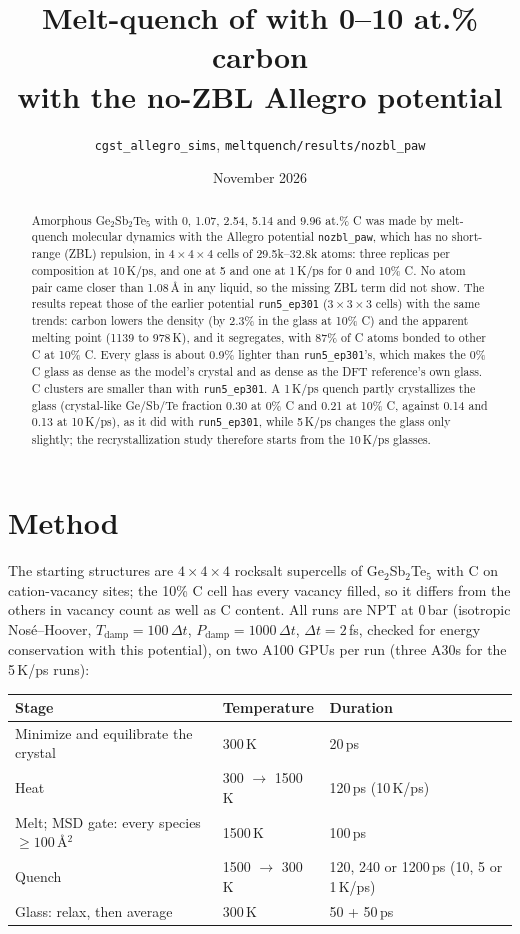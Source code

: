 \documentclass[11pt]{article}
\title{Melt-quench of \GST{} with 0--10 at.\% carbon\\ with the no-ZBL Allegro potential \nozbl}
\author{\texttt{cgst\_allegro\_sims}, \texttt{meltquench/results/nozbl\_paw}}
\date{November 2026}
\newcommand{\GST}{Ge$_2$Sb$_2$Te$_5$}
\newcommand{\nozbl}{\texttt{nozbl\_paw}}
\newcommand{\runfive}{\texttt{run5\_ep301}}
\begin{document}
\maketitle

\begin{abstract}
Amorphous \GST{} with 0, 1.07, 2.54, 5.14 and 9.96 at.\% C was made by melt-quench molecular dynamics with the
Allegro potential \nozbl{}, which has no short-range (ZBL) repulsion, in $4\times4\times4$ cells of 29.5k--32.8k
atoms: three replicas per composition at 10\,K/ps, and one at 5 and one at 1\,K/ps for 0 and 10\% C. No atom pair
came closer than 1.08\,\AA{} in any liquid, so the missing ZBL term did not show. The results repeat those of the
earlier potential \runfive{} ($3\times3\times3$ cells) with the same trends: carbon lowers the density (by 2.3\% in
the glass at 10\% C) and the apparent melting point (1139 to 978\,K), and it segregates, with 87\% of C atoms bonded
to other C at 10\% C. Every glass is about 0.9\% lighter than \runfive{}'s, which makes the 0\% C glass as dense as
the model's crystal and as dense as the DFT reference's own glass. C clusters are smaller than with \runfive{}.
A 1\,K/ps quench partly crystallizes the glass (crystal-like Ge/Sb/Te fraction 0.30 at 0\% C and 0.21 at 10\% C,
against 0.14 and 0.13 at 10\,K/ps), as it did with \runfive{}, while 5\,K/ps changes the glass only slightly; the
recrystallization study therefore starts from the 10\,K/ps glasses.
\end{abstract}

\section{Method}
The starting structures are $4\times4\times4$ rocksalt supercells of \GST{} with C on cation-vacancy sites; the 10\%
C cell has every vacancy filled, so it differs from the others in vacancy count as well as C content. All runs are
NPT at 0\,bar (isotropic Nos\'e--Hoover, $T_\text{damp}=100\,\Delta t$, $P_\text{damp}=1000\,\Delta t$,
$\Delta t=2$\,fs, checked for energy conservation with this potential), on two A100 GPUs per run (three A30s for the
5\,K/ps runs):

\begin{table}[H]
\centering
\begin{tabular}{lll}
\toprule
Stage & Temperature & Duration \\
\midrule
Minimize and equilibrate the crystal & 300\,K & 20\,ps \\
Heat & 300 $\to$ 1500\,K & 120\,ps (10\,K/ps) \\
Melt; MSD gate: every species $\geq 100$\,\AA$^2$ & 1500\,K & 100\,ps \\
Quench & 1500 $\to$ 300\,K & 120, 240 or 1200\,ps (10, 5 or 1\,K/ps) \\
Glass: relax, then average & 300\,K & 50 + 50\,ps \\
\bottomrule
\end{tabular}
\end{table}
\end{document}
